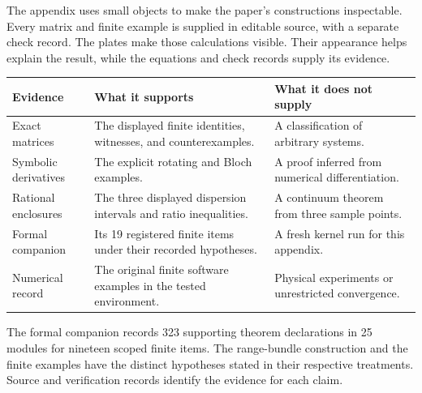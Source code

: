 The appendix uses small objects to make the paper's constructions inspectable. Every matrix and finite example is supplied in editable source, with a separate check record. The plates make those calculations visible. Their appearance helps explain the result, while the equations and check records supply its evidence.
\par\vspace{4pt}
\begin{tabularx}{\linewidth}{@{}p{.24\linewidth}YY@{}}
\toprule
Evidence & What it supports & What it does not supply\\\midrule
Exact matrices & The displayed finite identities, witnesses, and counterexamples. & A classification of arbitrary systems.\\
Symbolic derivatives & The explicit rotating and Bloch examples. & A proof inferred from numerical differentiation.\\
Rational enclosures & The three displayed dispersion intervals and ratio inequalities. & A continuum theorem from three sample points.\\
Formal companion & Its 19 registered finite items under their recorded hypotheses. & A fresh kernel run for this appendix.\\
Numerical record & The original finite software examples in the tested environment. & Physical experiments or unrestricted convergence.\\\bottomrule
\end{tabularx}
The formal companion records 323 supporting theorem declarations in 25 modules for nineteen scoped finite items. The range-bundle construction and the finite examples have the distinct hypotheses stated in their respective treatments. Source and verification records identify the evidence for each claim.

